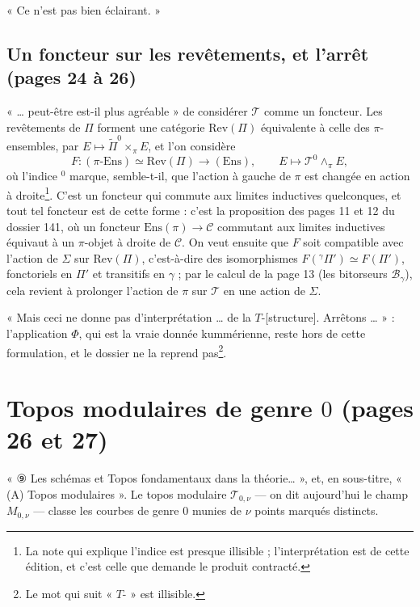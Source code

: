 \documentclass[11pt,a4paper]{article}
\begin{document}
« Ce n'est pas bien éclairant. »

\subsection*{Un foncteur sur les revêtements, et l'arrêt (pages 24 à 26)}

« … peut-être est-il plus agréable » de considérer $\mathcal{T}$ comme un
foncteur. Les revêtements de $\Pi$ forment une catégorie
$\mathrm{Rev}(\Pi)$ équivalente à celle des $\pi$-ensembles, par $E \mapsto
\widetilde\Pi^{0} \times_\pi E$, et l'on considère
\[
F : (\pi\text{-}\mathrm{Ens}) \simeq \mathrm{Rev}(\Pi) \longrightarrow
(\mathrm{Ens}), \qquad E \longmapsto \mathcal{T}^{0} \wedge_\pi E,
\]
où l'indice ${}^{0}$ marque, semble-t-il, que l'action à gauche de $\pi$ est
changée en action à droite\footnote{La note qui explique l'indice est presque
illisible ; l'interprétation est de cette édition, et c'est celle que demande
le produit contracté.}. C'est un foncteur qui commute aux limites inductives
quelconques, et tout tel foncteur est de cette forme : c'est la proposition des
pages 11 et 12 du dossier 141, où un foncteur $\mathrm{Ens}(\pi) \to
\mathcal{C}$ commutant aux limites inductives équivaut à un $\pi$-objet à droite
de $\mathcal{C}$. On veut ensuite que $F$ soit compatible avec l'action de
$\Sigma$ sur $\mathrm{Rev}(\Pi)$, c'est-à-dire des isomorphismes $F({}^{\gamma}
\Pi') \simeq F(\Pi')$, fonctoriels en $\Pi'$ et transitifs en $\gamma$ ; par le
calcul de la page 13 (les bitorseurs $\mathcal{B}_\gamma$), cela revient à
prolonger l'action de $\pi$ sur $\mathcal{T}$ en une action de $\Sigma$.

« Mais ceci ne donne pas d'interprétation … de la $T$-[structure]. Arrêtons
… » : l'application $\Phi$, qui est la vraie donnée kummérienne, reste hors
de cette formulation, et le dossier ne la reprend pas\footnote{Le mot qui suit
« $T$- » est illisible.}.

\section*{Topos modulaires de genre $0$ (pages 26 et 27)}

« ⑨ Les schémas et Topos fondamentaux dans la théorie… », et, en
sous-titre, « (A) Topos modulaires ». Le topos modulaire
$\mathcal{T}_{0,\nu}$ — on dit aujourd'hui le champ $M_{0,\nu}$ — classe les
courbes de genre $0$ munies de $\nu$ points marqués distincts.
\end{document}
